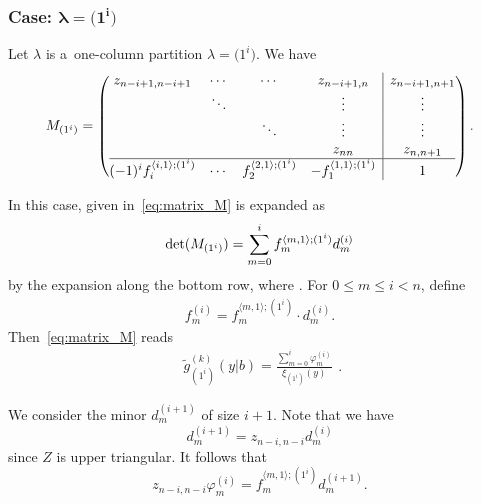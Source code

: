 \documentclass[10pt,a4paper]{amsart}
\numberwithin{equation}{section}
\newcommand{\bl}{\mathbf{l}}
\newcommand{\co}{\xi}
\newcommand{\la}{\lambda}
\newcommand{\ha}{f}
\theoremstyle{definition}
\begin{document}
\subsubsection[Case: la=(1\^{}i)]{Case: $\boldsymbol{\la=\bigl(1^i\bigr)}$}
Let $\lambda$ is a~one-column partition $\lambda=\bigl(1^i\bigr)$.
We have
\[
 M_{(1^i)}=
 \left(
\begin{array}{@{}cccc|c@{}}
 z_{n-i+1,n-i+1}&\cdots &\cdots &z_{n-i+1,n}&z_{n-i+1,n+1}\\
 &\ddots& &\vdots&\vdots\\
 &&\ddots &\vdots&\vdots\\
 & &&z_{nn}&z_{n,n+1}\\ \hline
 (-1)^i\ha_i^{\langle {i,1}\rangle;(1^i)} &\cdots
 & \ha_2^{\langle {2,1}\rangle;(1^i)} & -\ha_1^{\langle 1,1\rangle;(1^i)}&1
\end{array}
\right).
\]

In this case,  given in~\eqref{eq:matrix_M} is expanded as
\[%
\det(M_{(1^i)})
=
\sum_{m=0}^{i}
\ha_{m}^{\langle m,1\rangle;(1^i)}
d^{(i)}_m \\
\]
by the expansion along the bottom row,
where
.
For $0\le m\le i< n$, define
\begin{gather}
f^{(i)}_m=
\ha_{m}^{\langle m,1\rangle; (1^i)}
\cdot d^{(i)}_m.\label{eq: varphi m}
\end{gather}
Then~\eqref{eq:matrix_M} reads
\begin{equation}\label{eq:$K$-$k$-one_column_determinant}
\begin{aligned}
\tilde{g}^{(k)}_{(1^i)}(y|b)
=
\frac{
\sum_{m=0}^{i}
\varphi_m^{(i)}
}{\co_{(1^i)}(y)}
\end{aligned}.
\end{equation}

We consider the minor
$d^{(i+1)}_m$
of size $i+1$.
Note that we have
\begin{equation}
 d^{(i+1)}_m=z_{n-i,n-i}d^{(i)}_{m} \label{eq: d=dz}
\end{equation}
since $Z$ is upper triangular.
It follows that
\begin{equation}\label{eq:tilde varphi}
z_{n-i,n-i}\varphi_m^{(i)}=\ha_{m}^{\langle m,1\rangle; (1^i)}d^{(i+1)}_m.
\end{equation}
\end{document}
